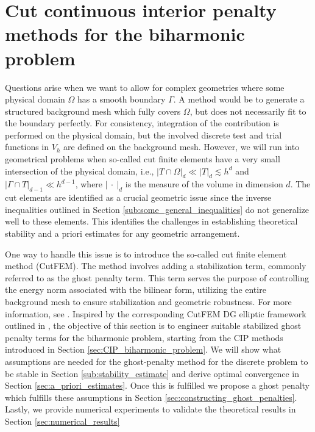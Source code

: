 \documentclass[11pt]{article}
\theoremstyle{remark}
\newcommand{\abs}[1]{\left\lvert #1 \right\rvert}
\numberwithin{equation}{section}
\begin{document}



\section{Cut continuous interior penalty methods for the biharmonic problem}%
\label{sec:cutcip_biharmonic_problem}


Questions arise when we want to allow for complex geometries where some physical domain $\Omega $ has a smooth boundary $\Gamma $.
A method would be to generate a structured background mesh which fully covers $\Omega $, but does not necessarily fit to the boundary perfectly.
For consistency, integration of the contribution is performed on the physical domain, but the involved discrete test and trial functions in $V_{h}$ are defined on the background mesh.
However, we will run into geometrical problems when
so-called cut finite elements have a very small intersection of the physical domain, i.e., $\abs{ T \cap \Omega  }_{d} \ll \abs{ T }_{d}  \lesssim h^{d}$ and $\abs{ \Gamma \cap T }_{d-1} \ll  h^{d-1}$, where $\abs{\ \cdot \  }_{d} $ is the
measure of the volume in dimension $d$.
The cut elements are identified as a crucial geometric issue since the inverse inequalities outlined in Section \ref{sub:some_general_inequalities} do not generalize well to these elements. This identifies the challenges in establishing theoretical stability and a priori estimates for any geometric arrangement.

One way to handle this issue is to introduce the so-called cut finite element method (CutFEM).
The method involves adding a stabilization term, commonly referred to as the ghost penalty term.
This term serves the purpose of controlling the energy norm associated with the bilinear form, utilizing the entire background mesh to ensure stabilization and geometric robustness.
For more information, see
\cite{burman2015cutfem, burman2010ghost, burman2022cutfem, burman2012fictitious}.
Inspired by the corresponding CutFEM DG elliptic framework outlined in \cite{gurkan2019stabilized}, the objective of this section is to engineer suitable stabilized ghost penalty terms for the biharmonic problem, starting from the CIP methods introduced in Section \ref{sec:CIP_biharmonic_problem}.
We will show what assumptions are needed for the ghost-penalty method for the discrete problem to be stable in Section \ref{sub:stability_estimate} and derive optimal convergence in Section \ref{sec:a_priori_estimates}.  Once
this is fulfilled we propose a ghost penalty which fulfills these assumptions in Section \ref{sec:constructing_ghost_penalties}. Lastly, we provide numerical experiments to validate the theoretical results in Section \ref{sec:numerical_results}
\end{document}
